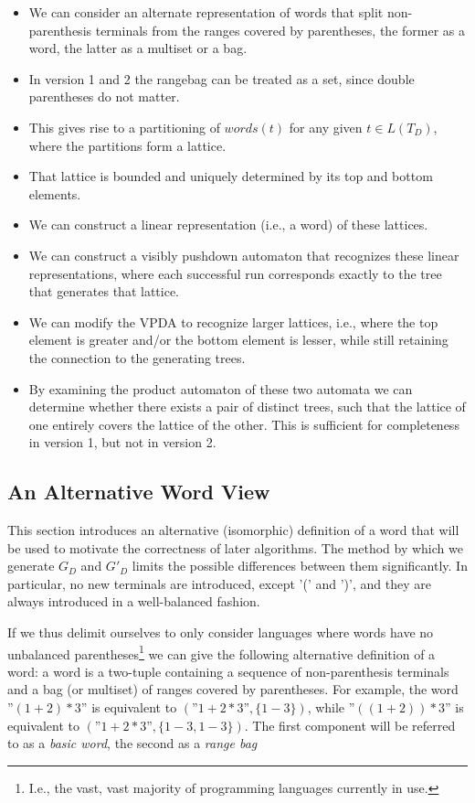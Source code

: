 \documentclass[acmsmall,review,anonymous]{acmart}\settopmatter{printfolios=true,printccs=false,printacmref=false}
\newcommand{\words}{\mathit{words}} %
\newcommand{\range}[2]{#1\!-\!#2}
\begin{document}
\begin{itemize}
\item We can consider an alternate representation of words that split non-parenthesis terminals from the ranges covered by parentheses, the former as a word, the latter as a multiset or a bag.
\item In version 1 and 2 the rangebag can be treated as a set, since double parentheses do not matter.
\item This gives rise to a partitioning of $\words(t)$ for any given $t \in L(T_D)$, where the partitions form a lattice.
\item That lattice is bounded and uniquely determined by its top and bottom elements.
\item We can construct a linear representation (i.e., a word) of these lattices.
\item We can construct a visibly pushdown automaton that recognizes these linear representations, where each successful run corresponds exactly to the tree that generates that lattice.
\item We can modify the VPDA to recognize larger lattices, i.e., where the top element is greater and/or the bottom element is lesser, while still retaining the connection to the generating trees.
\item By examining the product automaton of these two automata we can determine whether there exists a pair of distinct trees, such that the lattice of one entirely covers the lattice of the other. This is sufficient for completeness in version 1, but not in version 2.
\end{itemize}

\subsection{An Alternative Word View} \label{sec:word-view}

This section introduces an alternative (isomorphic) definition of a word that will be used to motivate the correctness of later algorithms. The method by which we generate $G_D$ and $G'_D$ limits the possible differences between them significantly. In particular, no new terminals are introduced, except '(' and ')', and they are always introduced in a well-balanced fashion.

If we thus delimit ourselves to only consider languages where words have no unbalanced parentheses\footnote{I.e., the vast, vast majority of programming languages currently in use.} we can give the following alternative definition of a word: a word is a two-tuple containing a sequence of non-parenthesis terminals and a bag (or multiset) of ranges covered by parentheses. For example, the word ''$(1 + 2) * 3$'' is equivalent to $(\text{''}1 + 2 * 3\text{''}, \{\range{1}{3}\})$, while ''$((1 + 2)) * 3$'' is equivalent to $(\text{''}1 + 2 * 3\text{''}, \{\range{1}{3}, \range{1}{3}\})$. The first component will be referred to as a \emph{basic word}, the second as a \emph{range bag}
\end{document}
